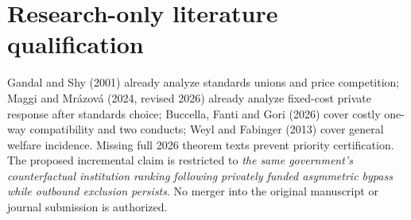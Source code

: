 \documentclass[11pt]{article}
\begin{document}
\section{Research-only literature qualification}
Gandal and Shy (2001) already analyze standards unions and price
competition; Maggi and Mr\'azov\'a (2024, revised 2026) already analyze
fixed-cost private response after standards choice; Buccella, Fanti
and Gori (2026) cover costly one-way compatibility and two conducts;
Weyl and Fabinger (2013) cover general welfare incidence.
Missing full 2026 theorem texts prevent priority certification.
The proposed incremental claim is restricted to
\emph{the same government's counterfactual institution ranking following
privately funded asymmetric bypass while outbound exclusion persists}.
No merger into the original manuscript or journal submission is authorized.
\end{document}
